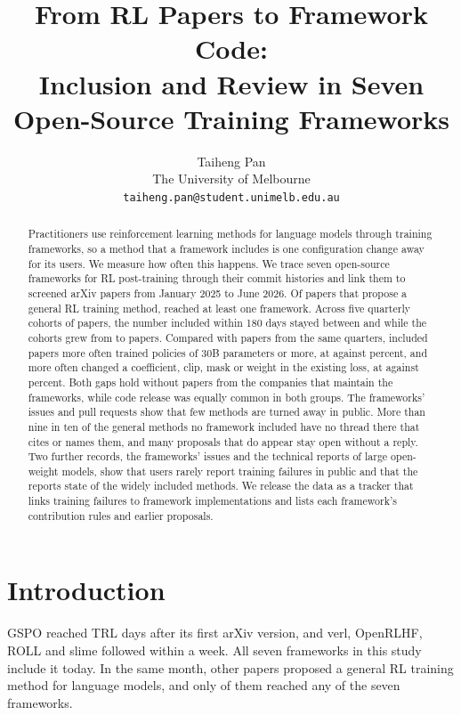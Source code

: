 \documentclass{article}
\title{From RL Papers to Framework Code:\\ Inclusion and Review in Seven Open-Source Training Frameworks}
\author{Taiheng Pan\\
The University of Melbourne\\
\texttt{taiheng.pan@student.unimelb.edu.au}}
\begin{document}
\maketitle

\begin{abstract}
Practitioners use reinforcement learning methods for language models through training frameworks, so a method that a framework includes is one configuration change away for its users. We measure how often this happens. We trace seven open-source frameworks for RL post-training through their commit histories and link them to \NPool{} screened arXiv papers from January 2025 to June 2026. Of \NGeneral{} papers that propose a general RL training method, \NAdopted{} reached at least one framework. Across five quarterly cohorts of papers, the number included within 180 days stayed between \QIncMin{} and \QIncMax{} while the cohorts grew from \QSupplyFirst{} to \QSupplyLast{} papers. Compared with papers from the same quarters, included papers more often trained policies of 30B parameters or more, at \CCBigThirtyCasePct{} against \CCBigThirtyCtrlPct{} percent, and more often changed a coefficient, clip, mask or weight in the existing loss, at \CCCoefCasePct{} against \CCCoefCtrlPct{} percent. Both gaps hold without papers from the companies that maintain the frameworks, while code release was equally common in both groups. The frameworks' issues and pull requests show that few methods are turned away in public. More than nine in ten of the general methods no framework included have no thread there that cites or names them, and many proposals that do appear stay open without a reply. Two further records, the frameworks' issues and the technical reports of \NReports{} large open-weight models, show that users rarely report training failures in public and that the reports state \NReportsMethodsUsed{} of the \NWideMethods{} widely included methods. We release the data as a tracker that links training failures to framework implementations and lists each framework's contribution rules and earlier proposals.
\end{abstract}

\section{Introduction}

GSPO \citep{arxiv250718071} reached TRL \GSPOtrl{} days after its first arXiv version, and verl, OpenRLHF, ROLL and slime followed within a week. All seven frameworks in this study include it today. In the same month, \NJulyOthers{} other papers proposed a general RL training method for language models, and only \NJulyOthersAdopted{} of them reached any of the seven frameworks.
\end{document}
